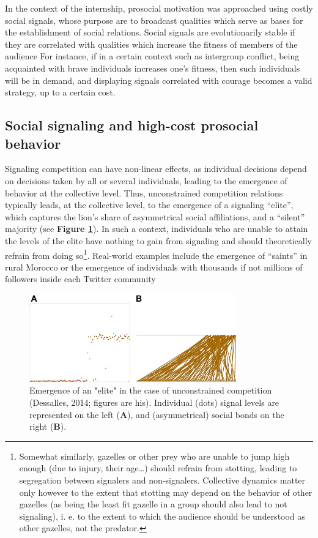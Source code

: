 \documentclass[a4paper,12pt]{report}
\begin{document}
In the context of the internship, prosocial motivation was approached 
using costly social signals, whose purpose are to broadcast qualities which 
serve as bases for the establishment of social relations. 
Social signals are evolutionarily stable if they are correlated with qualities 
which increase the fitness of members of the audience %
For instance, if in a certain context such as intergroup conflict, being acquainted 
with brave individuals increases one’s fitness, then such individuals will be in demand,
and displaying signals correlated with courage becomes a valid strategy, up to a certain
cost.

\subsection{Social signaling and high-cost prosocial behavior}
\label{s:heroism}
Signaling competition can have non-linear effects, as individual decisions depend on 
decisions taken by all or several individuals, leading to the emergence of behavior
at the collective level. Thus, unconstrained competition relations typically leads,
at the collective level, to the emergence of a signaling “elite”, which captures the
lion’s share of asymmetrical social affiliations, and a “silent” majority 
(see \textbf{Figure \ref{fig:asym_signal}}).
In such a context, individuals who are unable to attain the levels of the elite have
nothing to gain from signaling and should theoretically refrain from doing so\footnote{
    Somewhat similarly, gazelles or other prey who are unable to jump high enough
    (due to injury, their age…) should refrain from stotting, leading to segregation between
    signalers and non-signalers. Collective dynamics matter only however to the extent that
    stotting may depend on the behavior of other gazelles (as being the least fit gazelle
    in a group should also lead to not signaling), i. e. to 
    the extent to which the audience should be understood as other gazelles, not the predator.}.
Real-world examples include the emergence of “saints” in rural Morocco %
or the emergence of individuals with thousands if not millions of followers inside each
Twitter community %

\begin{figure}[h]
    \centering
    \includegraphics[width=0.8\textwidth]{Asym_sgl_JLD}
    \caption{Emergence of an "elite" in the case of unconstrained
    competition (Dessalles, 2014; figures are his). 
    Individual (dots) signal levels are represented on the left (\textbf{A}),
    and (asymmetrical) social bonds on the right (\textbf{B}).}
    \label{fig:asym_signal}
    \end{figure}
 
\end{document}
